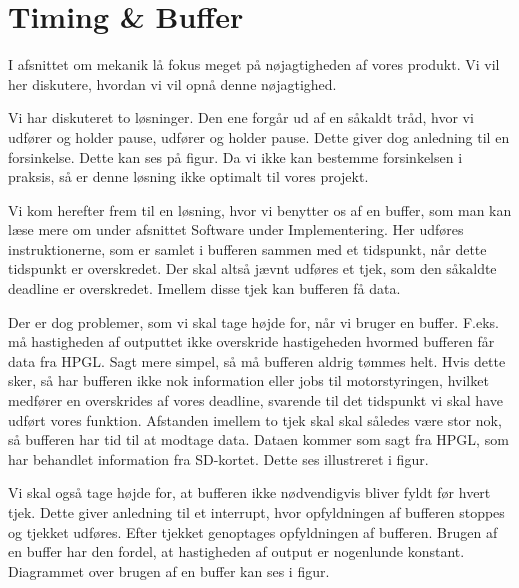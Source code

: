 \section{Timing & Buffer}

I afsnittet om mekanik lå fokus meget på nøjagtigheden af vores produkt. Vi vil her diskutere, hvordan vi vil opnå denne nøjagtighed.

Vi har diskuteret to løsninger. Den ene forgår ud af en såkaldt tråd, hvor vi udfører og holder pause, udfører og holder pause. Dette giver dog anledning til en forsinkelse. Dette kan ses på figur.
Da vi ikke kan bestemme forsinkelsen i praksis, så er denne løsning ikke optimalt til vores projekt.

Vi kom herefter frem til en løsning, hvor vi benytter os af en buffer, som man kan læse mere om under afsnittet Software under Implementering. Her udføres instruktionerne, som er samlet i bufferen sammen med et tidspunkt, når dette tidspunkt er overskredet. Der skal altså jævnt udføres et tjek, som den såkaldte deadline er overskredet. Imellem disse tjek kan bufferen få data.

Der er dog problemer, som vi skal tage højde for, når vi bruger en buffer. F.eks. må hastigheden af outputtet ikke overskride hastigeheden hvormed bufferen får data fra HPGL. Sagt mere simpel, så må bufferen aldrig tømmes helt. Hvis dette sker, så har bufferen ikke nok information eller jobs til motorstyringen, hvilket medfører en overskrides af vores deadline, svarende til det tidspunkt vi skal have udført vores funktion. Afstanden imellem to tjek skal skal således være stor nok, så bufferen har tid til at modtage data. Dataen kommer som sagt fra HPGL, som har behandlet information fra SD-kortet. Dette ses illustreret i figur.

Vi skal også tage højde for, at bufferen ikke nødvendigvis bliver fyldt før hvert tjek. Dette giver anledning til et interrupt, hvor opfyldningen af bufferen stoppes og tjekket udføres. Efter tjekket genoptages opfyldningen af bufferen. Brugen af en buffer har den fordel, at hastigheden af output er nogenlunde konstant. Diagrammet over brugen af en buffer kan ses i figur.


